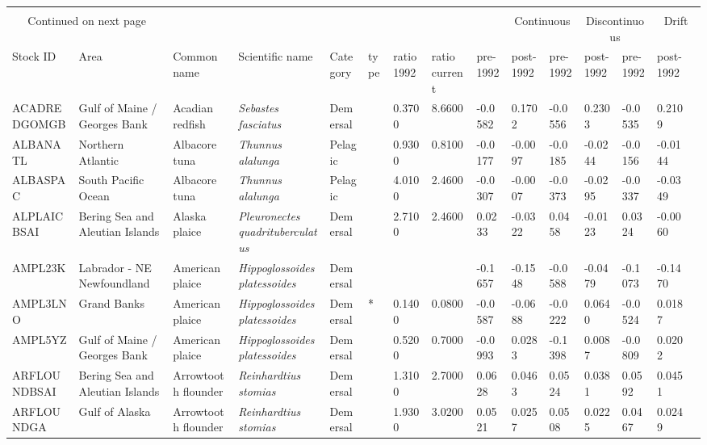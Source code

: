 \begin{longtable}{p{2.6cm}p{1.9cm}p{1.7cm}p{1.6cm}p{1cm}p{0.3cm}p{1cm}p{1cm}p{1cm}p{1.1cm}p{1cm}p{1.1cm}p{1cm}p{1.1cm}}
  \bottomrule \\ \multicolumn{2}{c}{Continued on next page} \endfoot \endlastfoot
 \toprule  & & & & & & & & \multicolumn{2}{c}{Continuous} & \multicolumn{2}{c}{Discontinuous} & \multicolumn{2}{c}{Drift} \\ 
\cmidrule{9-14}
 Stock ID & Area & Common name & Scientific name & Category & type & ratio 1992 & ratio current & pre-1992 & post-1992 & pre-1992 & post-1992 & pre-1992 & post-1992  \\ \midrule \endhead
ACADREDGOMGB & Gulf of Maine / Georges Bank & Acadian redfish & \textit{Sebastes fasciatus} & Demersal &   & 0.3700 & 8.6600 & -0.0582 & 0.1702 & -0.0556 & 0.2303 & -0.0535 & 0.2109 \\ 
  ALBANATL & Northern Atlantic & Albacore tuna & \textit{Thunnus alalunga} & Pelagic &   & 0.9300 & 0.8100 & -0.0177 & -0.0097 & -0.0185 & -0.0244 & -0.0156 & -0.0144 \\ 
  ALBASPAC & South Pacific Ocean & Albacore tuna & \textit{Thunnus alalunga} & Pelagic &   & 4.0100 & 2.4600 & -0.0307 & -0.0007 & -0.0373 & -0.0295 & -0.0337 & -0.0349 \\ 
  ALPLAICBSAI & Bering Sea and Aleutian Islands & Alaska plaice & \textit{Pleuronectes quadrituberculatus} & Demersal &   & 2.7100 & 2.4600 & 0.0233 & -0.0322 & 0.0458 & -0.0123 & 0.0324 & -0.0060 \\ 
  AMPL23K & Labrador - NE Newfoundland & American plaice & \textit{Hippoglossoides platessoides} & Demersal &  &  &  & -0.1657 & -0.1548 & -0.0588 & -0.0479 & -0.1073 & -0.1470 \\ 
  AMPL3LNO & Grand Banks & American plaice & \textit{Hippoglossoides platessoides} & Demersal & * & 0.1400 & 0.0800 & -0.0587 & -0.0688 & -0.0222 & 0.0640 & -0.0524 & 0.0187 \\ 
  AMPL5YZ & Gulf of Maine / Georges Bank & American plaice & \textit{Hippoglossoides platessoides} & Demersal &   & 0.5200 & 0.7000 & -0.0993 & 0.0283 & -0.1398 & 0.0087 & -0.0809 & 0.0202 \\ 
  ARFLOUNDBSAI & Bering Sea and Aleutian Islands & Arrowtooth flounder & \textit{Reinhardtius stomias} & Demersal &   & 1.3100 & 2.7000 & 0.0628 & 0.0463 & 0.0524 & 0.0381 & 0.0592 & 0.0451 \\ 
  ARFLOUNDGA & Gulf of Alaska & Arrowtooth flounder & \textit{Reinhardtius stomias} & Demersal &   & 1.9300 & 3.0200 & 0.0521 & 0.0257 & 0.0508 & 0.0225 & 0.0467 & 0.0249 \\ 

\end{longtable}

